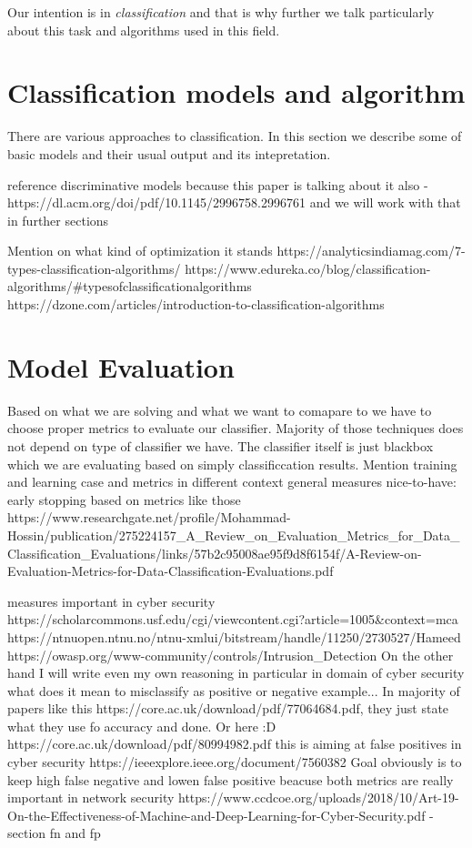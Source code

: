 Our intention is in \emph{classification} and that is why further we talk particularly about this task and algorithms used in this field.

\section{Classification models and algorithm}
There are various approaches to classification. In this section we describe some of basic models and their usual output and its intepretation. 

reference discriminative models because this paper is talking about it also - https://dl.acm.org/doi/pdf/10.1145/2996758.2996761 and we will work with that in further sections

Mention on what kind of optimization it stands
https://analyticsindiamag.com/7-types-classification-algorithms/
https://www.edureka.co/blog/classification-algorithms/#typesofclassificationalgorithms
https://dzone.com/articles/introduction-to-classification-algorithms

\section{Model Evaluation}
Based on what we are solving and what we want to comapare to we have to choose proper metrics to evaluate our classifier. Majority of those techniques does not depend on type of classifier we have. The classifier itself is just blackbox which we are evaluating based on simply classificcation results.
Mention training and learning case and metrics in different context
general measures
nice-to-have: early stopping based on metrics like those
https://www.researchgate.net/profile/Mohammad-Hossin/publication/275224157_A_Review_on_Evaluation_Metrics_for_Data_Classification_Evaluations/links/57b2c95008ae95f9d8f6154f/A-Review-on-Evaluation-Metrics-for-Data-Classification-Evaluations.pdf

measures important in cyber security
https://scholarcommons.usf.edu/cgi/viewcontent.cgi?article=1005&context=mca
https://ntnuopen.ntnu.no/ntnu-xmlui/bitstream/handle/11250/2730527/Hameed%
https://owasp.org/www-community/controls/Intrusion_Detection
On the other hand I will write even my own reasoning in particular in domain of cyber security what does it mean to misclassify as positive or negative example...
In majority of papers like this https://core.ac.uk/download/pdf/77064684.pdf, they just state what they use fo accuracy and done. Or here :D https://core.ac.uk/download/pdf/80994982.pdf
this is aiming at false positives in cyber security https://ieeexplore.ieee.org/document/7560382
Goal obviously is to keep high false negative and lowen false positive beacuse both metrics are really important in network security
https://www.ccdcoe.org/uploads/2018/10/Art-19-On-the-Effectiveness-of-Machine-and-Deep-Learning-for-Cyber-Security.pdf - section fn and fp



